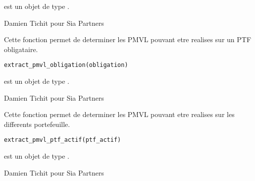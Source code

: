 \documentclass[a4paper]{book}
\begin{document}
%
\begin{Arguments}
\begin{ldescription}
\item[\code{immobilier}] est un objet de type .
\end{ldescription}
\end{Arguments}
%
\begin{Author}\relax
Damien Tichit pour Sia Partners
\end{Author}
%
\begin{Description}\relax
Cette fonction permet de determiner les PMVL pouvant etre realises sur un PTF obligataire.
\end{Description}
%
\begin{Usage}
\begin{verbatim}
extract_pmvl_obligation(obligation)
\end{verbatim}
\end{Usage}
%
\begin{Arguments}
\begin{ldescription}
\item[\code{obligation}] est un objet de type .
\end{ldescription}
\end{Arguments}
%
\begin{Author}\relax
Damien Tichit pour Sia Partners
\end{Author}
%
\begin{Description}\relax
Cette fonction permet de determiner les PMVL pouvant etre realises sur les differents portefeuille.
\end{Description}
%
\begin{Usage}
\begin{verbatim}
extract_pmvl_ptf_actif(ptf_actif)
\end{verbatim}
\end{Usage}
%
\begin{Arguments}
\begin{ldescription}
\item[\code{ptf\_actif}] est un objet de type .
\end{ldescription}
\end{Arguments}
%
\begin{Author}\relax
Damien Tichit pour Sia Partners
\end{Author}
\end{document}
